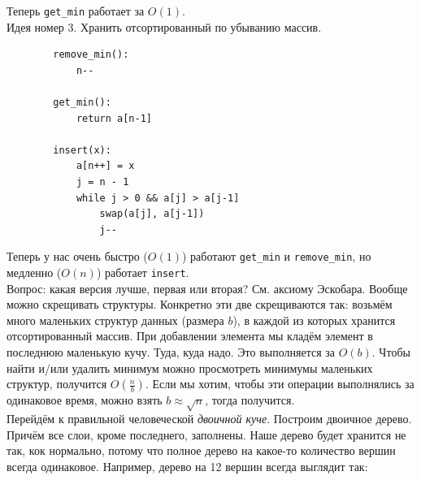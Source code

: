\documentclass{article}
\newcommand{\pseudo}{PseudoLexer.py:PseudoLexer -x}
\newcommand{\pseudocode}[1]{\texttt{#1}}
\begin{document}
    Теперь \pseudocode{get_min} работает за $O(1)$.\\
    Идея номер 3. Хранить отсортированный по убыванию массив.
    \begin{verbatim}
        remove_min():
            n--

        get_min():
            return a[n-1]

        insert(x):
            a[n++] = x
            j = n - 1
            while j > 0 && a[j] > a[j-1]
                swap(a[j], a[j-1])
                j--
    \end{verbatim}
    Теперь у нас очень быстро ($O(1)$) работают \pseudocode{get_min} и \pseudocode{remove_min}, но медленно ($O(n)$) работает \pseudocode{insert}.\\
    Вопрос: какая версия лучше, первая или вторая? См. аксиому Эскобара. Вообще можно скрещивать структуры. Конкретно эти две скрещиваются так: возьмём много маленьких структур данных (размера $b$), в каждой из которых хранится отсортированный массив. При добавлении элемента мы кладём элемент в последнюю маленькую кучу. Туда, куда надо. Это выполняется за $O(b)$. Чтобы найти и/или удалить минимум можно просмотреть минимумы маленьких структур, получится $O(\frac nb)$. Если мы хотим, чтобы эти операции выполнялись за одинаковое время, можно взять $b\approx\sqrt n$, тогда получится.\\
    Перейдём к правильной человеческой \textit{двоичной куче}. Построим двоичное дерево. Причём все слои, кроме последнего, заполнены. Наше дерево будет хранится не так, кок нормально, потому что полное дерево на какое-то количество вершин всегда одинаковое. Например, дерево на 12 вершин всегда выглядит так:\\
    \\
\end{document}
